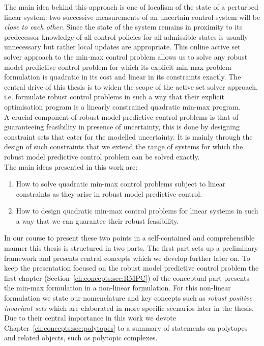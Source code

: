 %
The main idea behind this approach is one of localism of the state of a perturbed linear system: two successive measurements of an uncertain control system will be \emph{close to each other}.
%
Since the state of the system remains in proximity to its predecessor knowledge of all control policies for all admissible states is usually unnecessary but rather local updates are appropriate.
%
This online active set solver approach to the min-max control problem allows us to solve any robust model predictive control problem for which its explicit min-max problem formulation is quadratic in its cost and linear in its constraints exactly.
%
The central drive of this thesis is to widen the scope of the active set solver approach, i.e. formulate robust control problems in such a way that their explicit optimisation program is a linearly constrained quadratic min-max program.
%
\\[1em]
%
A crucial component of robust model predictive control problems is that of guaranteeing feasibility in presence of uncertainty, this is done by designing constraint sets that cater for the modelled uncertainty.
%
It is mainly through the design of such constraints that we extend the range of systems for which the robust model predictive control problem can be solved exactly.
%
\\[1em]
%
The main ideas presented in this work are:
%
\begin{enumerate}
	\item How to solve quadratic min-max control problems subject to linear constraints as they arise in robust model predictive control.
	\item How to design quadratic min-max control problems for linear systems in such a way that we can guarantee their robust feasibility.
\end{enumerate}
%
In our course to present these two points in a self-contained and comprehensible manner this thesis is structured in two parts.
%
The first part sets up a preliminary framework and presents central concepts which we develop further later on.
%
To keep the presentation focused on the robust model predictive control problem the first chapter (Section~\ref{ch:concepts:sec:RMPC}) of the conceptual part presents the min-max formulation in a non-linear formulation.
%
For this non-linear formulation we state our nomenclature and key concepts such as \emph{robust positive invariant sets} which are elaborated in more specific scenarios later in the thesis.
%
Due to their central importance in this work we devote Chapter~\ref{ch:concepts:sec:polytopes} to a summary of statements on polytopes and related objects, such as polytopic complexes.
